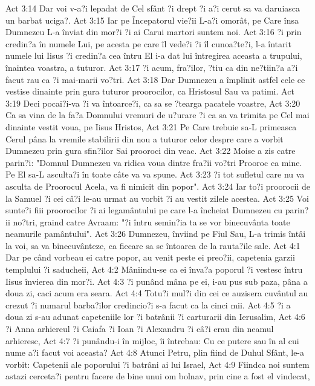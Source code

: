 Act 3:14  Dar voi v-a?i lepadat de Cel sfânt ?i drept ?i a?i cerut sa va daruiasca un barbat uciga?.
Act 3:15  Iar pe Începatorul vie?ii L-a?i omorât, pe Care însa Dumnezeu L-a înviat din mor?i ?i ai Carui martori suntem noi.
Act 3:16  ?i prin credin?a în numele Lui, pe acesta pe care îl vede?i ?i îl cunoa?te?i, l-a întarit numele lui Iisus ?i credin?a cea întru El i-a dat lui întregirea aceasta a trupului, înaintea voastra, a tuturor.
Act 3:17  ?i acum, fra?ilor, ?tiu ca din ne?tiin?a a?i facut rau ca ?i mai-marii vo?tri.
Act 3:18  Dar Dumnezeu a împlinit astfel cele ce vestise dinainte prin gura tuturor proorocilor, ca Hristosul Sau va patimi.
Act 3:19  Deci pocai?i-va ?i va întoarce?i, ca sa se ?tearga pacatele voastre,
Act 3:20  Ca sa vina de la fa?a Domnului vremuri de u?urare ?i ca sa va trimita pe Cel mai dinainte vestit voua, pe Iisus Hristos,
Act 3:21  Pe Care trebuie sa-L primeasca Cerul pâna la vremile stabilirii din nou a tuturor celor despre care a vorbit Dumnezeu prin gura sfin?ilor Sai prooroci din veac.
Act 3:22  Moise a zis catre parin?i: "Domnul Dumnezeu va ridica voua dintre fra?ii vo?tri Prooroc ca mine. Pe El sa-L asculta?i în toate câte va va spune.
Act 3:23  ?i tot sufletul care nu va asculta de Proorocul Acela, va fi nimicit din popor".
Act 3:24  Iar to?i proorocii de la Samuel ?i cei câ?i le-au urmat au vorbit ?i au vestit zilele acestea.
Act 3:25  Voi sunte?i fiii proorocilor ?i ai legamântului pe care l-a încheiat Dumnezeu cu parin?ii no?tri, graind catre Avraam: "?i întru semin?ia ta se vor binecuvânta toate neamurile pamântului".
Act 3:26  Dumnezeu, înviind pe Fiul Sau, L-a trimis întâi la voi, sa va binecuvânteze, ca fiecare sa se întoarca de la rauta?ile sale.
Act 4:1  Dar pe când vorbeau ei catre popor, au venit peste ei preo?ii, capetenia garzii templului ?i saducheii,
Act 4:2  Mâniindu-se ca ei înva?a poporul ?i vestesc întru Iisus învierea din mor?i.
Act 4:3  ?i punând mâna pe ei, i-au pus sub paza, pâna a doua zi, caci acum era seara.
Act 4:4  Totu?i mul?i din cei ce auzisera cuvântul au crezut ?i numarul barba?ilor credincio?i s-a facut ca la cinci mii.
Act 4:5  ?i a doua zi s-au adunat capeteniile lor ?i batrânii ?i carturarii din Ierusalim,
Act 4:6  ?i Anna arhiereul ?i Caiafa ?i Ioan ?i Alexandru ?i câ?i erau din neamul arhieresc,
Act 4:7  ?i punându-i în mijloc, îi întrebau: Cu ce putere sau în al cui nume a?i facut voi aceasta?
Act 4:8  Atunci Petru, plin fiind de Duhul Sfânt, le-a vorbit: Capetenii ale poporului ?i batrâni ai lui Israel,
Act 4:9  Fiindca noi suntem astazi cerceta?i pentru facere de bine unui om bolnav, prin cine a fost el vindecat,
